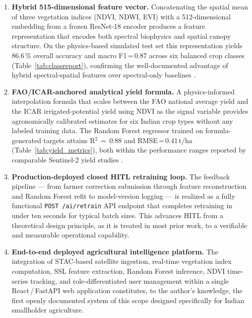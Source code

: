 \documentclass[12pt,a4paper,oneside]{report}
\begin{document}
\begin{enumerate}

  \item \textbf{Hybrid 515-dimensional feature vector.}
        Concatenating the spatial mean of three vegetation indices (NDVI, NDWI, EVI)
        with a 512-dimensional embedding from a frozen ResNet-18 encoder produces a
        feature representation that encodes both spectral biophysics and spatial canopy
        structure. On the physics-based simulated test set this representation yields
        86.6\,\% overall accuracy and macro F1\,=\,0.87 across six balanced crop
        classes (Table~\ref{tab:classreport}), confirming the well-documented advantage
        of hybrid spectral-spatial features over spectral-only baselines
        \cite{liakos2018machine, kussul2017deep}.

  \item \textbf{FAO/ICAR-anchored analytical yield formula.}
        A physics-informed interpolation formula that scales between the FAO national
        average yield and the ICAR irrigated-potential yield using NDVI as the signal
        variable provides agronomically calibrated estimates for six Indian crop types
        without any labeled training data. The Random Forest regressor trained on
        formula-generated targets attains R$^2\,=\,0.88$ and
        RMSE\,=\,0.41\,t/ha (Table~\ref{tab:yield_metrics}), both within the
        performance ranges reported by comparable Sentinel-2 yield studies
        \cite{jeong2016random, li2024crop}.

  \item \textbf{Production-deployed closed HITL retraining loop.}
        The feedback pipeline — from farmer correction submission through feature
        reconstruction and Random Forest refit to model-version logging — is
        realized as a fully functional \texttt{POST /ai/retrain} API endpoint that
        completes retraining in under ten seconds for typical batch sizes. This
        advances HITL from a theoretical design principle, as it is treated in most
        prior work, to a verifiable and measurable operational capability.

  \item \textbf{End-to-end deployed agricultural intelligence platform.}
        The integration of STAC-based satellite ingestion, real-time vegetation index
        computation, SSL feature extraction, Random Forest inference, NDVI time-series
        tracking, and role-differentiated user management within a single
        React\,/\,FastAPI web application constitutes, to the author's knowledge,
        the first openly documented system of this scope designed specifically for
        Indian smallholder agriculture.

\end{enumerate}
\end{document}
